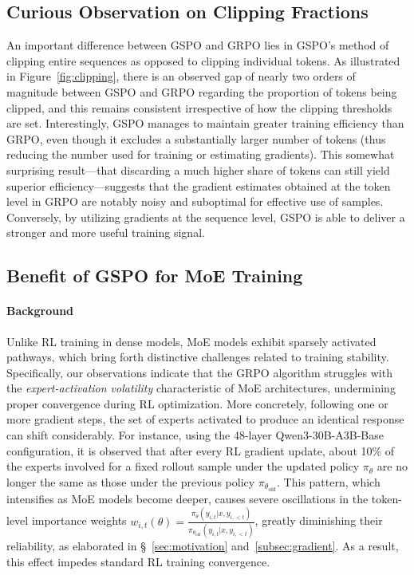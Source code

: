 \subsection{Curious Observation on Clipping Fractions}

An important difference between GSPO and GRPO lies in GSPO's method of clipping entire sequences as opposed to clipping individual tokens. As illustrated in Figure~\ref{fig:clipping}, there is an observed gap of nearly two orders of magnitude between GSPO and GRPO regarding the proportion of tokens being clipped, and this remains consistent irrespective of how the clipping thresholds are set. Interestingly, GSPO manages to maintain greater training efficiency than GRPO, even though it excludes a substantially larger number of tokens (thus reducing the number used for training or estimating gradients). This somewhat surprising result—that discarding a much higher share of tokens can still yield superior efficiency—suggests that the gradient estimates obtained at the token level in GRPO are notably noisy and suboptimal for effective use of samples. Conversely, by utilizing gradients at the sequence level, GSPO is able to deliver a stronger and more useful training signal.

\subsection{Benefit of GSPO for MoE Training}
\label{subsec:routing_replay}

\paragraph{Background}
Unlike RL training in dense models, MoE models exhibit sparsely activated pathways, which bring forth distinctive challenges related to training stability. Specifically, our observations indicate that the GRPO algorithm struggles with the \textit{expert-activation volatility} characteristic of MoE architectures, undermining proper convergence during RL optimization. More concretely, following one or more gradient steps, the set of experts activated to produce an identical response can shift considerably. For instance, using the 48-layer Qwen3-30B-A3B-Base configuration, it is observed that after every RL gradient update, about 10\% of the experts involved for a fixed rollout sample under the updated policy $\pi_{\theta}$ are no longer the same as those under the previous policy $\pi_{\theta_\text{old}}$. This pattern, which intensifies as MoE models become deeper, causes severe oscillations in the token-level importance weights $w_{i,t}(\theta) = \frac{ \pi_{\theta} (y_{i,t} | x, y_{i,<t}) }{ \pi_{\theta_\text{old}} (y_{i,t} | x,y_{i,<t})}$, greatly diminishing their reliability, as elaborated in \S~\ref{sec:motivation} and~\ref{subsec:gradient}. As a result, this effect impedes standard RL training convergence.


